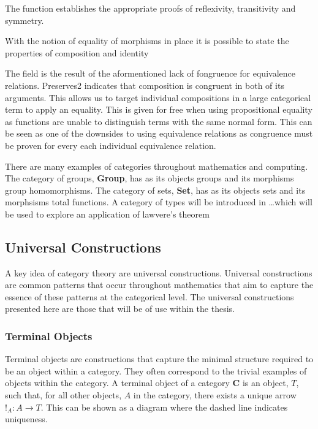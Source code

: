
The  function establishes the appropriate proofs of
reflexivity, transitivity and symmetry.

With the notion of equality of morphisms in place it is possible to state the
properties of composition and identity


The field  is the result of the aformentioned lack of
fongruence for equivalence relations. Preserves2 indicates that composition is
congruent in both of its arguments. This allows us to target individual
compositions in a large categorical term to apply an equality. This is given for
free when using propositional equality as functions are unable to distinguish
terms with the same normal form. This can be seen as one of the downsides to
using equivalence relations as congruence must be proven for every each
individual equivalence relation.

There are many examples of categories throughout mathematics and computing. The
category of groups, \textbf{Group}, has as its objects groups and its morphisms
group homomorphisms. The category of sets, \textbf{Set}, has as its objects sets
and its morphsisms total functions. A category of types will be introduced in
\ldots which will be used to explore an application of lawvere's theorem
\subsection{Universal Constructions}

A key idea of category theory are universal constructions. Universal
constructions are common patterns that occur throughout mathematics
that aim to capture the essence of these patterns at the categorical level. The
universal constructions presented here are those that will be of use within the
thesis.

\subsubsection{Terminal Objects}
Terminal objects are constructions that capture the minimal structure required
to be an object within a category. They often correspond to the trivial examples
of objects within the category.  A terminal object of a category \textbf{C} is
an object, $T$, such that, for all other objects, $A$ in the category, there
exists a unique arrow $!_{A}: A \rightarrow T$. This can be shown as a diagram
where the dashed line indicates uniqueness.

